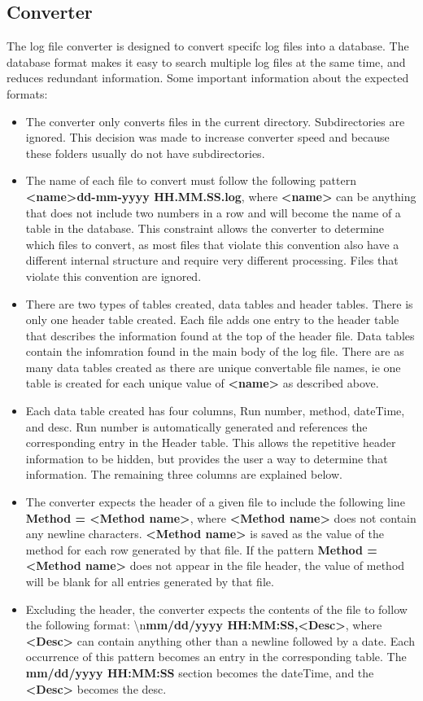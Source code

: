 \documentclass[letterpaper,11pt,twoside,final]{article}
\begin{document}
\subsection*{Converter}
The log file converter is designed to convert specifc log files into a database. The database format makes it easy to search
multiple log files at the same time, and reduces redundant
information. Some important information about the expected formats:
\begin{itemize}
  \item The converter only converts files in the current
directory. Subdirectories are ignored. This decision was made to
increase converter speed and because these folders usually
do not have subdirectories. 
  \item The name of each file to convert must follow the following pattern
    \textbf{<name>dd-mm-yyyy HH.MM.SS.log}, where \textbf{<name>} can be
    anything that does not include two numbers in a row and will
    become the name of a table in the database.
    This constraint allows the converter to determine which files to
    convert, as most files that violate this convention also have a
    different internal structure and require very different
    processing. Files that violate this convention are ignored.
  \item There are two types of tables created, data tables and header
    tables. There is only one header table created. Each file adds one
    entry to the header table that describes the information found at
    the top of the header file. Data tables contain the infomration
    found in the main body of the log file. There are as many data
    tables created as there are unique convertable file names, ie one
    table is created for each unique value of \textbf{<name>} as
    described above.
    \item
    Each data table created has four columns, Run number, method, dateTime, and
    desc. Run number is automatically generated and references the
    corresponding entry in the Header table. This allows the
    repetitive header information to be hidden, but provides the user
    a way to determine that information. The remaining three columns
    are explained below.
  \item The converter expects the header of a given file to include
    the following line \textbf{Method = <Method name>}, where
    \textbf{<Method name>} does not contain any newline characters. \textbf{<Method name>} is
    saved as the value of the method for each row generated by that
    file. If the pattern \textbf{Method = <Method name>} does not
    appear in the file header, the value of method will be blank for
    all entries generated by that file.
  \item Excluding the header, the converter expects the contents of
    the file to follow the following format: \textbackslash n\textbf{mm/dd/yyyy HH:MM:SS,<Desc>}, where \textbf{<Desc>} can
    contain anything other than a newline followed by a date. Each
    occurrence of this pattern becomes an entry in the corresponding
    table. The \textbf{mm/dd/yyyy HH:MM:SS} section becomes the dateTime, and
    the \textbf{<Desc>} becomes the desc.
\end{itemize}
\end{document}
